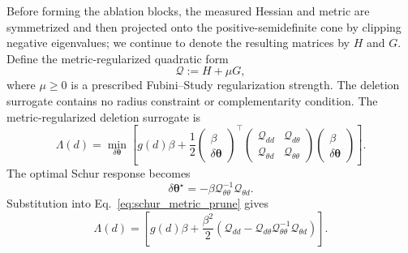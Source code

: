 \documentclass[
  reprint,
  amsmath,
  amssymb,
  aps,
  pra,
  nofootinbib,
  superscriptaddress,
  floatfix
]{revtex4-2}
\begin{document}
Before forming the ablation blocks, the measured Hessian and metric are
symmetrized and then projected onto the positive-semidefinite cone by clipping
negative eigenvalues; we continue to denote the resulting matrices by \(H\)
and \(G\). Define the metric-regularized quadratic form
\[
\mathcal Q:=H+\mu G,
\]
where \(\mu\ge0\) is a prescribed Fubini--Study regularization strength. The
deletion surrogate contains no radius constraint or complementarity condition.
The metric-regularized deletion surrogate is
\begin{equation}
\Lambda(d)
=
\min_{\delta\boldsymbol\theta}
\left[
g(d)\beta
+\frac12
\begin{pmatrix}
\beta\\
\delta\boldsymbol\theta
\end{pmatrix}^{\!\top}
\begin{pmatrix}
\mathcal Q_{dd} & \mathcal Q_{d\theta}\\
\mathcal Q_{\theta d} & \mathcal Q_{\theta\theta}
\end{pmatrix}
\begin{pmatrix}
\beta\\
\delta\boldsymbol\theta
\end{pmatrix}
\right].
\label{eq:schur_metric_prune}
\end{equation}
The optimal Schur response becomes
\begin{equation*}
\delta\boldsymbol\theta^\star
=
-\beta\mathcal Q_{\theta\theta}^{-1}\mathcal Q_{\theta d}.
\end{equation*}
Substitution into Eq.~\eqref{eq:schur_metric_prune} gives
\begin{equation*}
\Lambda(d)
=
\left[
g(d)\beta
+\frac{\beta^2}{2}
\left(
\mathcal Q_{dd}
-\mathcal Q_{d\theta}
\mathcal Q_{\theta\theta}^{-1}
\mathcal Q_{\theta d}
\right)
\right].
\end{equation*}
\end{document}
